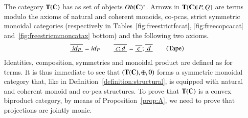 The category $\mathbf{T}(\mathbf{C})$ has as set of objects $Ob(\mathbf{C})^*$. Arrows in $\mathbf{T}(\mathbf{C})[P,Q]$ are terms modulo the axioms of natural and coherent monoids, co-pcas, strict symmetric monoidal categories (respectively in Tables~\ref{fig:freestrictfccat}, \ref{fig:freecopcacat} and~\ref{fig:freestricmmoncatax} bottom) and the following two axioms.
\begin{equation}\label{eq:TapeFunctAxioms}
\tapeFunct{\id{P}}=\id{P} \qquad \tapeFunct{c;d} = \tapeFunct{c}; \tapeFunct{d} \tag{Tape}
\end{equation}
Identities, composition, symmetries and monoidal product are defined as for terms. It is thus immediate to see that $(\mathbf{T}(\mathbf{C}),\oplus, 0)$ forms a symmetric monoidal category that, like in Definition~\ref{definition:structural}, is equipped with natural and coherent monoid and co-pca structures. To prove that $\mathbf{T}(\mathbf{C})$ is a convex biproduct category, by means of Proposition~\ref{prop:A}, we need to prove that projections are jointly monic.




%
%
%
%

